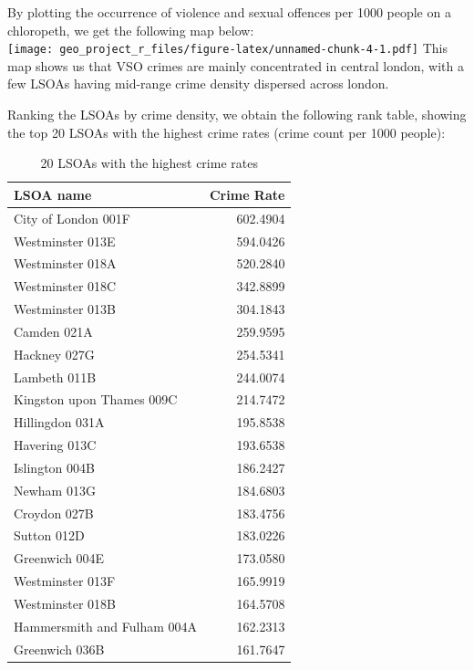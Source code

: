 \documentclass[]{article}
\theoremstyle{definition}
\theoremstyle{definition}
\theoremstyle{definition}
\theoremstyle{remark}
\begin{document}
By plotting the occurrence of violence and sexual offences per 1000
people on a chloropeth, we get the following map below:\\
\texttt{[image: geo\_project\_r\_files/figure-latex/unnamed-chunk-4-1.pdf]}
This map shows us that VSO crimes are mainly concentrated in central
london, with a few LSOAs having mid-range crime density dispersed across
london.

Ranking the LSOAs by crime density, we obtain the following rank table,
showing the top 20 LSOAs with the highest crime rates (crime count per
1000 people):

\begin{table}

\caption{\label{tab:unnamed-chunk-5}20 LSOAs with the highest crime rates}
\centering
\begin{tabular}[t]{l|r}
\hline
LSOA name & Crime Rate\\
\hline
City of London 001F & 602.4904\\
\hline
Westminster 013E & 594.0426\\
\hline
Westminster 018A & 520.2840\\
\hline
Westminster 018C & 342.8899\\
\hline
Westminster 013B & 304.1843\\
\hline
Camden 021A & 259.9595\\
\hline
Hackney 027G & 254.5341\\
\hline
Lambeth 011B & 244.0074\\
\hline
Kingston upon Thames 009C & 214.7472\\
\hline
Hillingdon 031A & 195.8538\\
\hline
Havering 013C & 193.6538\\
\hline
Islington 004B & 186.2427\\
\hline
Newham 013G & 184.6803\\
\hline
Croydon 027B & 183.4756\\
\hline
Sutton 012D & 183.0226\\
\hline
Greenwich 004E & 173.0580\\
\hline
Westminster 013F & 165.9919\\
\hline
Westminster 018B & 164.5708\\
\hline
Hammersmith and Fulham 004A & 162.2313\\
\hline
Greenwich 036B & 161.7647\\
\hline
\end{tabular}
\end{table}
\end{document}
